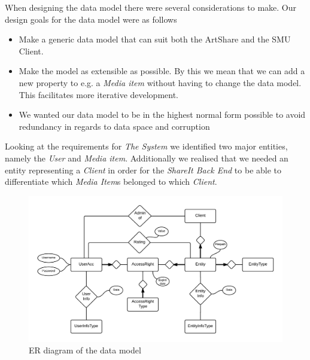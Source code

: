 \documentclass[../report.tex]{subfiles}
\begin{document}
\graphicspath{{img/}{../img/}}

When designing the data model there were several considerations to make. Our design goals for the data model were as follows
\begin{itemize}
\item Make a generic data model that can suit both the ArtShare and the SMU Client.
\item Make the model as extensible as possible. By this we mean that we can add a new property to e.g. a \textit{Media item} without having to change the data model. This facilitates more iterative development.
\item We wanted our data model to be in the highest normal form possible to avoid redundancy in regards to data space and corruption
\end{itemize} 






Looking at the requirements for \textit{The System} we identified two major entities, namely the \textit{User} and \textit{Media item}. Additionally we realised that we needed an entity representing a \textit{Client} in order for the \textit{ShareIt Back End} to be able to differentiate which \textit{Media Item}s belonged to which \textit{Client}. \\

\begin{figure}[H]
\includegraphics[width=\linewidth]{ER.png}
\caption{ER diagram of the data model}
\label{fig:use case diagram}
\end{figure}
\end{document}
